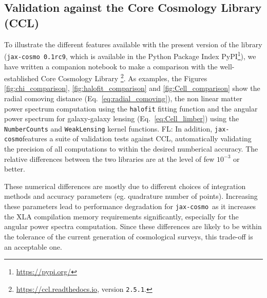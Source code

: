 \documentclass[twocolumn,twocolappendix,nofootinbib,iop]{openjournal}
\newcommand{\nblink}[1]{\href{https://github.com/DifferentiableUniverseInitiative/jax-cosmo-paper/blob/master/notebooks/#1.ipynb}{\faFileCodeO}}
\newcommand{\FrL}[1]{{\color{cyan}FL: #1}}
\newcommand{\jaxcosmo}{\texttt{jax-cosmo}}
\begin{document}
\subsection{Validation against the Core Cosmology Library (CCL)}
%
To illustrate the different features available with the present version of the library (\jaxcosmo\ \texttt{0.1rc9}, which is available in the Python Package Index PyPI\footnote{\url{https://pypi.org/}}), we have written a  companion notebook \nblink{CCL_comparison} to make a comparison with the well-established  Core Cosmology Library \citep{2019ApJS..242....2C}\footnote{\url{https://ccl.readthedocs.io}, version \texttt{2.5.1}.}. As examples, the Figures \ref{fig:chi_comparison},
\ref{fig:halofit_comparison} and \ref{fig:Cell_comparison}
show the radial comoving distance (Eq.~\ref{eq:radial_comoving}), the non linear matter power spectrum computation using the \texttt{halofit} fitting function and the angular power spectrum for galaxy-galaxy lensing (Eq.~\ref{eq:Cell_limber}) using the \texttt{NumberCounts} and \texttt{WeakLensing} kernel functions. \FrL{In addition, \jaxcosmo features a suite of validation tests against CCL, automatically validating the precision of all computations to within the desired numberical accuracy.} The relative differences between the two libraries are at the level of few $10^{-3}$ or better.

These numerical differences are mostly due to different choices of integration methods and accuracy parameters (eg. quadrature number of points). Increasing these parameters lead to performance degradation for \jaxcosmo\ as it increases the XLA compilation memory requirements significantly, especially for the angular power spectra computation. Since these differences are likely to be within the tolerance of the current generation of cosmological surveys, this trade-off is an acceptable one.
\end{document}
